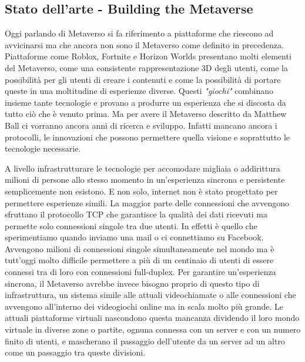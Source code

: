    \subsection{Stato dell'arte - Building the Metaverse}

    Oggi parlando di Metaverso si fa riferimento a piattaforme che riescono ad avvicinarsi ma che ancora non sono il Metaverso come definito in precedenza.
    Piattaforme come Roblox, Fortnite e Horizon Worlds presentano molti elementi del Metaverso, come una consistente rappresentazione 3D degli utenti, come la possibilità per gli utenti di creare i contenuti e come la possibilità di portare queste in una moltitudine di esperienze diverse. 
    Questi \textit{"giochi"} combinano insieme tante tecnologie e provano a produrre un esperienza che si discosta da tutto ciò che è venuto prima. Ma per avere il Metaverso descritto da Matthew Ball ci vorranno ancora anni di ricerca e sviluppo. 
    Infatti mancano ancora i protocolli, le innovazioni che possono permettere quella visione e soprattutto le tecnologie necessarie.
    
    A livello infrastrutturare le tecnologie per accomodare migliaia o addirittura milioni di persone allo stesso momento in un'esperienza sincrona e persistente semplicemente non esistono.
    E non solo, internet non è stato progettato per permettere esperienze simili.
    La maggior parte delle connessioni che avvengono sfruttano il protocollo TCP che garantisce la qualità dei dati ricevuti ma permette solo connessioni singole tra due utenti.
    In effetti è quello che sperimentiamo quando inviamo una mail o ci connettiamo su Facebook.
    Avvengono milioni di connessioni singole simultaneamente nel mondo ma è tutt'oggi molto difficile permettere a più di un centinaio di utenti di essere connessi tra di loro con connessioni full-duplex.
    Per garantire un'esperienza sincrona, il Metaverso avrebbe invece bisogno proprio di questo tipo di infrastruttura, un sistema simile alle attuali videochiamate o alle connessioni che avvengono all'interno dei videogiochi online ma in scala molto più grande.
    Le attuali piattaforme virtuali nascondono questa mancanza dividendo il loro mondo virtuale in diverse zone o partite, ognuna connessa con un server e con un numero finito di utenti, e mascherano il passaggio dell'utente da un server ad un altro come un passaggio tra queste divisioni.

